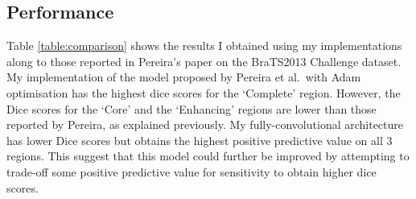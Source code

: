 \documentclass[12pt,a4paper,twoside,openright]{report}
\begin{document}
\subsection{Performance}
Table \ref{table:comparison} shows the results I obtained using my implementations along to those reported in Pereira's paper on the BraTS2013 Challenge dataset. My implementation of the model proposed by Pereira et al.\ with Adam optimisation has the highest dice scores for the `Complete' region. However, the Dice scores for the `Core' and the `Enhancing' regions are lower than those reported by Pereira, as explained previously. My fully-convolutional architecture has lower Dice scores but obtains the highest positive predictive value on all 3 regions. This suggest that this model could further be improved by attempting to trade-off some positive predictive value for sensitivity to obtain higher dice scores. 

\begin{table}[h]
\centering	
{}
\caption{Comparison of model performances on the Brats2013 Challenge dataset.}
\label{table:comparison}
\end{table}
\end{document}
